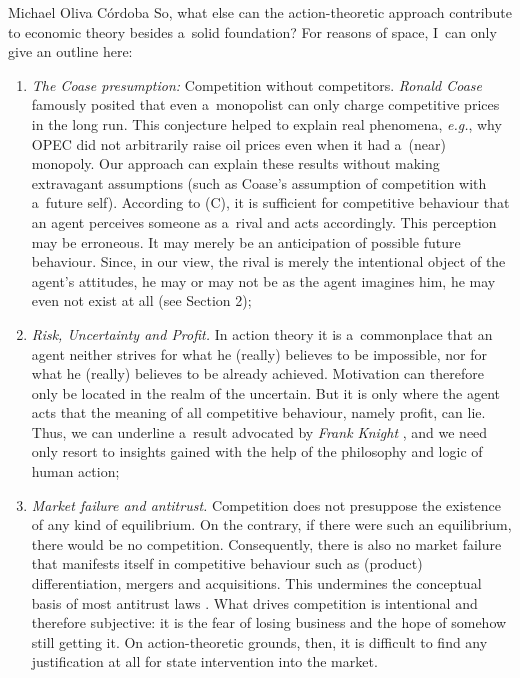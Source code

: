 \begin{artengenv}{Michael Oliva Córdoba}
So, what else can the action-theoretic approach contribute to economic theory besides a~solid foundation? For reasons of space, I~can only give an outline here:



\begin{enumerate}[label=(\roman*)]

\item \textit{The Coase presumption:} Competition without competitors. \textit{Ronald Coase} 
\parencite*[][]{coase_durability_1972} %
 famously posited that even a~monopolist can only charge competitive prices in the long run. This conjecture helped to explain real phenomena, \textit{e.g.}, why OPEC did not arbitrarily raise oil prices even when it had a~(near) monopoly. Our approach can explain these results without making extravagant assumptions (such as Coase's assumption of competition with a~future self). According to (C), it is sufficient for competitive behaviour that an agent perceives someone as a~rival and acts accordingly. This perception may be erroneous. It may merely be an anticipation of possible future behaviour. Since, in our view, the rival is merely the intentional object of the agent's attitudes, he may or may not be as the agent imagines him, he may even not exist at all (see Section 2);

\item \textit{Risk, Uncertainty and Profit.} In action theory it is a~commonplace that an agent neither strives for what he (really) believes to be impossible, nor for what he (really) believes to be already achieved. Motivation can therefore only be located in the realm of the uncertain. But it is only where the agent acts that the meaning of all competitive behaviour, namely profit, can lie. Thus, we can underline a~result advocated by \textit{Frank Knight} 
\parencite*[][]{knight_risk_1921}, %
 and we need only resort to insights gained with the help of the philosophy and logic of human action;

\item \textit{Market failure and antitrust.} Competition does not presuppose the existence of any kind of equilibrium. On the contrary, if there were such an equilibrium, there would be no competition. Consequently, there is also no market failure that manifests itself in competitive behaviour such as (product) differentiation, mergers and acquisitions. This undermines the conceptual basis of most antitrust laws 
\parencite[cf.][]{armentano_myths_1972}. %
 What drives competition is intentional and therefore subjective: it is the fear of losing business and the hope of somehow still getting it. On action-theoretic grounds, then, it is difficult to find any justification at all for state intervention into the market.


\end{enumerate}
\end{artengenv}
